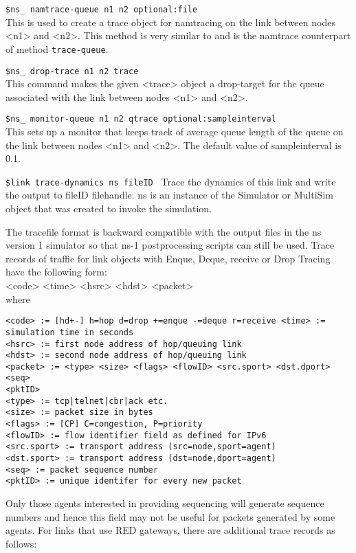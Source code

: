 \begin{flushleft}
{\tt \$ns\_ namtrace-queue \<n1\> \<n2\> \<optional:file\>}\\
This is used to create a trace object for namtracing on the link between
nodes <n1> and <n2>. This method is very similar to and is the namtrace
counterpart of method {\tt trace-queue}.


{\tt \$ns\_ drop-trace \<n1\> \<n2\> \<trace\>}\\
This command makes the given <trace> object a drop-target for the queue
associated with the link between nodes <n1> and <n2>.


{\tt \$ns\_ monitor-queue \<n1\> \<n2\> \<qtrace\> \<optional:sampleinterval\>}\\
This sets up a monitor that keeps track of average queue length of the queue
on the link between nodes <n1> and <n2>. The default value of
sampleinterval is 0.1. 


{\tt \$link trace-dynamics \<ns\> \<fileID\> }
Trace the dynamics of this link and write the output to fileID filehandle.
ns is an instance of the Simulator or MultiSim object that was created to
invoke the simulation. 

The tracefile format is backward compatible with the output files in the
ns version 1 simulator so that ns-1 postprocessing scripts can still be
used. Trace records of traffic for link objects with Enque, Deque, receive
or Drop Tracing have the following form: \\

<code> <time> <hsrc> <hdst> <packet> \\

where 
\begin{verbatim}
<code> := [hd+-] h=hop d=drop +=enque -=deque r=receive <time> :=
simulation time in seconds 
<hsrc> := first node address of hop/queuing link 
<hdst> := second node address of hop/queuing link 
<packet> := <type> <size> <flags> <flowID> <src.sport> <dst.dport> <seq>
<pktID> 
<type> := tcp|telnet|cbr|ack etc.
<size> := packet size in bytes
<flags> := [CP] C=congestion, P=priority 
<flowID> := flow identifier field as defined for IPv6 
<src.sport> := transport address (src=node,sport=agent) 
<dst.sport> := transport address (dst=node,dport=agent) 
<seq> := packet sequence number
<pktID> := unique identifer for every new packet 
\end{verbatim}

Only those agents interested in providing sequencing will generate
sequence numbers and hence this field may not be useful for packets
generated by some agents. For links that use RED gateways, there are
additional trace records as follows: \\


\end{flushleft}
